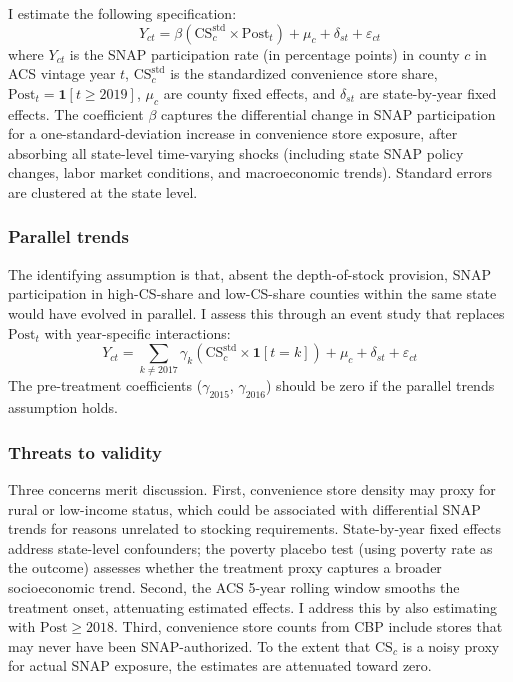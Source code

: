 \documentclass[12pt]{article}
\begin{document}
I estimate the following specification:
\begin{equation}
Y_{ct} = \beta (\text{CS}^{\text{std}}_{c} \times \text{Post}_{t}) + \mu_{c} + \delta_{st} + \varepsilon_{ct}
\label{eq:main}
\end{equation}
where $Y_{ct}$ is the SNAP participation rate (in percentage points) in county $c$ in ACS vintage year $t$, $\text{CS}^{\text{std}}_{c}$ is the standardized convenience store share, $\text{Post}_{t} = \mathbf{1}[t \geq 2019]$, $\mu_{c}$ are county fixed effects, and $\delta_{st}$ are state-by-year fixed effects. The coefficient $\beta$ captures the differential change in SNAP participation for a one-standard-deviation increase in convenience store exposure, after absorbing all state-level time-varying shocks (including state SNAP policy changes, labor market conditions, and macroeconomic trends). Standard errors are clustered at the state level.

\subsubsection*{Parallel trends} The identifying assumption is that, absent the depth-of-stock provision, SNAP participation in high-CS-share and low-CS-share counties within the same state would have evolved in parallel. I assess this through an event study that replaces $\text{Post}_{t}$ with year-specific interactions:
\begin{equation}
Y_{ct} = \sum_{k \neq 2017} \gamma_{k} (\text{CS}^{\text{std}}_{c} \times \mathbf{1}[t = k]) + \mu_{c} + \delta_{st} + \varepsilon_{ct}
\label{eq:event}
\end{equation}
The pre-treatment coefficients ($\gamma_{2015}$, $\gamma_{2016}$) should be zero if the parallel trends assumption holds.

\subsubsection*{Threats to validity} Three concerns merit discussion. First, convenience store density may proxy for rural or low-income status, which could be associated with differential SNAP trends for reasons unrelated to stocking requirements. State-by-year fixed effects address state-level confounders; the poverty placebo test (using poverty rate as the outcome) assesses whether the treatment proxy captures a broader socioeconomic trend. Second, the ACS 5-year rolling window smooths the treatment onset, attenuating estimated effects. I address this by also estimating with $\text{Post} \geq 2018$. Third, convenience store counts from CBP include stores that may never have been SNAP-authorized. To the extent that $\text{CS}_{c}$ is a noisy proxy for actual SNAP exposure, the estimates are attenuated toward zero.
\end{document}
